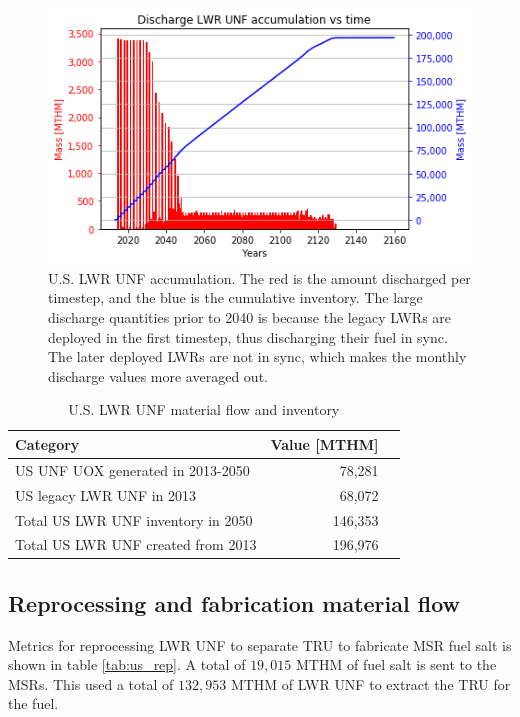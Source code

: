 \begin{figure}[htbp!]
	\begin{center}
		\includegraphics[scale=0.6]{./images/us/us_lwr_unf.png}
	\end{center}
	\caption{U.S. \gls{LWR} \gls{UNF} accumulation. The red is the
			amount discharged per timestep, and the blue is the cumulative
			inventory. The large discharge quantities prior to 2040 is because the legacy \glspl{LWR}
			are deployed in the first timestep, thus discharging their fuel in sync.
			The later deployed \glspl{LWR} are not in sync, which makes the monthly
			discharge values more averaged out.}
	\label{fig:us_lwr_unf}
\end{figure}

\begin{table}[h]
	\centering
	\caption{U.S. \gls{LWR} \gls{UNF} material flow and inventory}
	\begin{tabular}{lrl}
		\hline
		\textbf{Category} & \textbf{Value [MTHM]} \\
		\hline
		US \gls{UNF} UOX generated in 2013-2050 & 78,281 \\
		US legacy \gls{LWR} \gls{UNF} in 2013 & 68,072 \\
		Total US \gls{LWR} \gls{UNF} inventory in 2050 & 146,353 \\
		Total US \gls{LWR} \gls{UNF} created from 2013 & 196,976 \\
		\hline
	\end{tabular}
	\label{tab:us_lwr_unf}
\end{table}


\subsection{Reprocessing and fabrication material flow}

Metrics for reprocessing \gls{LWR} \gls{UNF} to
separate \gls{TRU} to fabricate \gls{MSR} fuel salt
is shown in table \ref{tab:us_rep}. A total of
$19,015$ MTHM of fuel salt is sent to the \glspl{MSR}.
This used a total of $132,953$ MTHM of \gls{LWR} \gls{UNF}
to extract the \gls{TRU} for the fuel.

